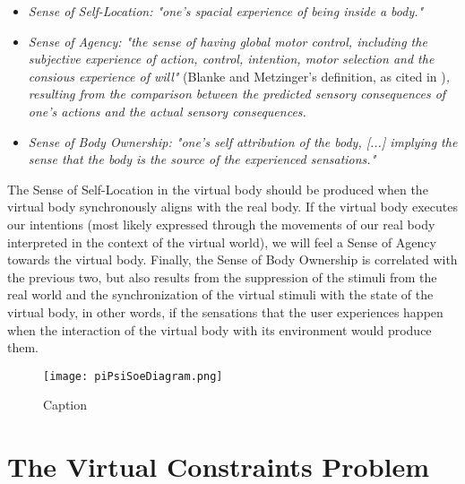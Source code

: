 \begin{displayquote}
\begin{itemize}
\item \textit{Sense of Self-Location: "one's spacial experience of being inside a body."}
\item \textit{Sense of Agency: "the sense of having global motor control, including the subjective experience of action, control, intention, motor selection and the consious experience of will"} (Blanke and Metzinger's definition, as cited in \parencite{Kilteni2012})\textit{, resulting from the comparison between the predicted sensory consequences of one's actions and the actual sensory consequences.}
\item \textit{Sense of Body Ownership: "one's self attribution of the body, [...] implying the sense that the body is the source of the experienced sensations."}
\end{itemize}
\end{displayquote}

The Sense of Self-Location in the virtual body should be produced when the virtual body synchronously aligns with the real body. If the virtual body executes our intentions (most likely expressed through the movements of our real body interpreted in the context of the virtual world), we will feel a Sense of Agency towards the virtual body. Finally, the Sense of Body Ownership is correlated with the previous two, but also results from the suppression of the stimuli from the real world \parencite{Schubert1999} and the synchronization of the virtual stimuli with the state of the virtual body, in other words, if the sensations that the user experiences happen when the interaction of the virtual body with its environment would produce them.

\begin{figure}[h]
\centering
\texttt{[image: piPsiSoeDiagram.png]}
\caption{Caption}
\label{fig:piPsiSoeDiagram}
\end{figure}


\section{The Virtual Constraints Problem}
\label{sec:virtualContraintsProblem}

